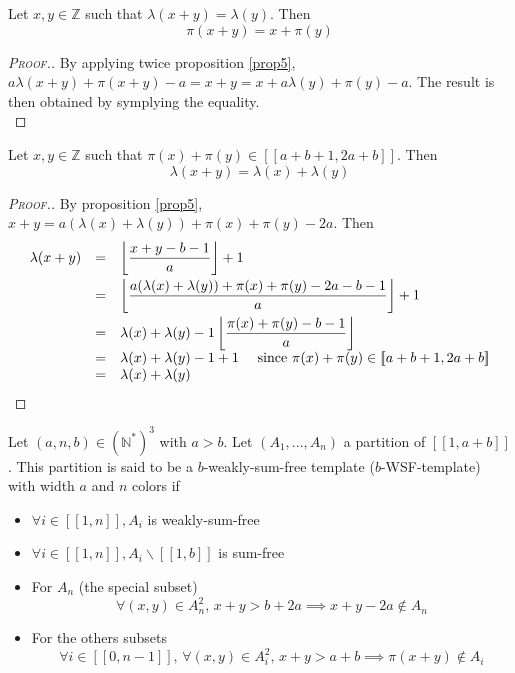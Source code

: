 \begin{proposition}
\label{prop6}
Let \(x, y \in \mathbb{Z}\) such that \(\lambda(x + y) = \lambda(y)\). Then 
\[
\pi(x + y) = x + \pi(y)
\]
\end{proposition}

\begin{proof}[\textsc{Proof.}]
By applying twice proposition \ref{prop5}, \(a \lambda(x + y) + \pi(x + y) - a = x + y = x + a \lambda(y) + \pi(y) - a\). 
The result is then obtained by symplying the equality. \\
\end{proof}

\begin{proposition}
\label{prop7}
Let \(x, y \in \mathbb{Z}\) such that \(\pi(x) + \pi(y) \in [\![a + b + 1, 2 a + b]\!]\). Then 
\[
\lambda(x + y) = \lambda(x) + \lambda(y)
\]
\end{proposition}

\begin{proof}[\textsc{Proof.}]
By proposition \ref{prop5}, \(x + y = a (\lambda(x) + \lambda(y)) + \pi(x) + \pi(y) - 2 a\). Then
\[
\begin{array}{l l l}
	\lambda(x + y) & = & \left \lfloor \dfrac{x + y - b - 1}{a} \right \rfloor + 1 \vspace{1mm} \\
	 & = & \left \lfloor \dfrac{a (\lambda(x) + \lambda(y)) + \pi(x) + \pi(y) - 2 a - b - 1}{a} \right \rfloor + 1 \vspace{1mm} \\
	 & = & \lambda(x) + \lambda(y) - 1 \left \lfloor \dfrac{\pi(x) + \pi(y) - b - 1}{a}\right\rfloor \\
	 & = & \lambda(x)+\lambda(y) -1 +1 ~~~~\text{since } \pi(x) + \pi(y) \in [\![a + b + 1, 2 a + b]\!] \\
	 & =& \lambda(x)+\lambda(y)
\end{array}
\]
\end{proof}

\begin{definition}
Let \( (a,n,b) \in (\mathbb{N}^*)^3\) with \(a > b\). Let \((A_1,...,A_n)\) a partition of  \([\![1, a + b]\!]\).
This partition is said to be a \(b\)-weakly-sum-free template (\(b\)-WSF-template) with width \(a\) and \(n\) colors if

\begin{itemize}
\item \(\forall i \in [\![1, n]\!], A_i\) is weakly-sum-free
\item \(\forall i \in [\![1, n]\!], A_i\backslash [\![1, b]\!]\) is sum-free
\item For \(A_n\) (the special subset)
	\[
	\forall (x,y) \in A_n^2, \,x+y>b+2a \implies x+y-2a\notin A_n
	\]
\item For the others subsets
	\[
	\forall i \in [\![0,n-1]\!], \, \forall(x,y) \in A_i^2, \, x+y>a+b \implies \pi(x+y) \notin A_i
	\]
\end{itemize}
\end{definition}

